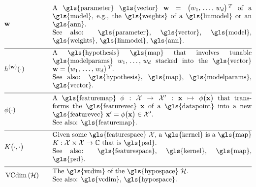 \begin{align} 
	&\weights  &\quad & \parbox{.85\textwidth}{A \gls{parameter} \gls{vector} $\weights = \big(\weight_{1}, \,\ldots, \,\weight_{\featuredim}\big)\,^{T}$ 
		of a \gls{model}, e.g., the \gls{weights} of a \gls{linmodel} or an \gls{ann}.
		\\ See also: \gls{parameter}, \gls{vector}, \gls{model}, \gls{weights}, \gls{linmodel}, \gls{ann}. }     \nonumber \\[2mm] \hline \nonumber\\[-5mm]
	&\hypothesis^{(\weights)}(\cdot)  &\quad &\parbox{.85\textwidth}{A \gls{hypothesis} \gls{map} that involves tunable \gls{modelparams} 
		$\weight_{1}, \,\ldots, \,\weight_{\featuredim}$ stacked into the \gls{vector} $\weights=\big(\weight_{1}, \,\ldots, \,\weight_{\featuredim} \big)\,^{T}$.
		\\ See also: \gls{hypothesis}, \gls{map}, \gls{modelparams}, \gls{vector}. } \nonumber \\[2mm] \hline \nonumber\\[-5mm]
	&\featuremap(\cdot)  &\quad & \parbox{.85\textwidth}{A \gls{featuremap} 
		$\featuremap: \featurespace \rightarrow \featurespace' : \featurevec \mapsto \featuremap\big( \featurevec \big)$ that 
		transforms the \gls{featurevec} $\featurevec$ of a \gls{datapoint} into a new \gls{featurevec} $\featurevec'= \featuremap\big( \featurevec \big) \in \featurespace'$.
		\\ See also: \gls{featuremap}. }   \nonumber \\[2mm] \hline \nonumber\\[-5mm]
	&\kernelmap{\cdot}{\cdot} &\quad & \parbox{.85\textwidth}{Given some \gls{featurespace} $\featurespace$, 
		a \gls{kernel} is a \gls{map} $\kernel: \featurespace \times \featurespace \rightarrow \mathbb{C}$ that is \gls{psd}.
		\\ See also: \gls{featurespace}, \gls{kernel}, \gls{map}, \gls{psd}. }    \nonumber \\[2mm] \hline \nonumber\\[-5mm]  
	&\vcdim{\hypospace} &\quad & \parbox{.85\textwidth}{The \gls{vcdim} of the \gls{hypospace} $\hypospace$. 
		\\ See also: \gls{vcdim}, \gls{hypospace}. }    \nonumber                                                                                                                                               
\end{align}              






